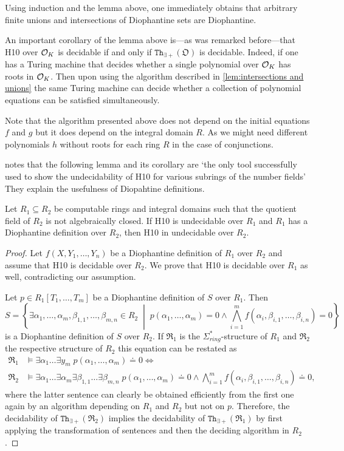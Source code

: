 Using induction and the lemma above, one immediately obtains that arbitrary
finite unions and intersections of Diophantine sets are Diophantine.

An important corollary of the lemma above is---as was remarked before---that
\textsc{H10} over $\mathcal{O}_{K}$ is decidable if and only if $\mathtt{Th}_{∃+}
(\mathfrak O)$ is decidable. Indeed, if one has a Turing machine that decides
whether a single polynomial over $\mathcal{O}_{K}$ has roots in $\mathcal{O}_{K}$. Then upon
using the algorithm described in \cref{lem:intersections and unions} the same
Turing machine can decide whether a collection of polynomial equations can be
satisfied simultaneously.

Note that the algorithm presented above does not depend on the initial equations
$f$ and $g$ but it does depend on the integral domain $R$. As we might need
different polynomials $h$ without roots for each ring $R$ in the case of
conjunctions.

\textcite{Shlapentokh2000} notes that the following lemma and its corollary are
`the only tool successfully used to show the undecidability of \textsc{H10}
for various subrings of the number fields' They explain the usefulness
of Diopahtine definitions.

\begin{lem} \label{lem:moving up}
Let $R_1 \subseteq R_2$ be computable rings and integral domains such
that the quotient field of $R_2$ is not algebraically closed. If \textsc{H10}
is undecidable over $R_1$ and $R_1$ has a Diophantine definition over
$R_2$, then \textsc{H10} in undecidable over $R_2$.
\end{lem}
\begin{proof}
Let $f(X, Y_1, …, Y_n)$ be a Diophantine definition of $R_1$ over $R_2$ and
assume that \textsc{H10} is decidable over $R_2$. We prove that \textsc{H10} is
decidable over $R_1$ as well, contradicting our assumption.

Let $p ∈ R_1[T_1, …, T_m]$ be a Diophantine definition of $S$ over
$R_1$. Then
\[
  S = \left\lbrace ∃α_1,…,α_m, β_{1,1}, …, β_{m,n} ∈ R_2 \;\middle|\; p(α_1, …, α_m) = 0 ∧ \bigwedge_{i=1}^m f(α_i, β_{i,1},…,β_{i,n}) = 0 \right\rbrace
\]
is a Diophantine definition of $S$ over $R_2$. If $\mathfrak R_1$ is the
$Σ_{ring}^*$-structure of $R_1$ and $\mathfrak R_2$ the respective
structure of $R_2$ this equation can be restated as
\begin{align*}
  \mathfrak R_1 &\models ∃ α_1 … ∃ y_m \; p(α_1, …, α_m) \doteq 0 ⇔ \\
  \mathfrak R_2 &\models ∃α_1 … ∃ α_m ∃ β_{1,1} … ∃ β_{m,n} \; p(α_1, …, α_m) \doteq 0 ∧ \bigwedge_{i=1}^m f(α_i, β_{i,1},…,β_{i,n}) \doteq 0,
\end{align*}
where the latter sentence can clearly be obtained efficiently from the first one
again by an algorithm depending on $R_1$ and $R_2$ but not on $p$. Therefore,
the decidability of $\mathtt{Th}_{∃+}(\mathfrak R_2)$ implies the decidability
of $\mathtt{Th}_{∃+}(\mathfrak R_1)$ by first applying the transformation of
sentences and then the deciding algorithm in $R_2$.
\end{proof}

